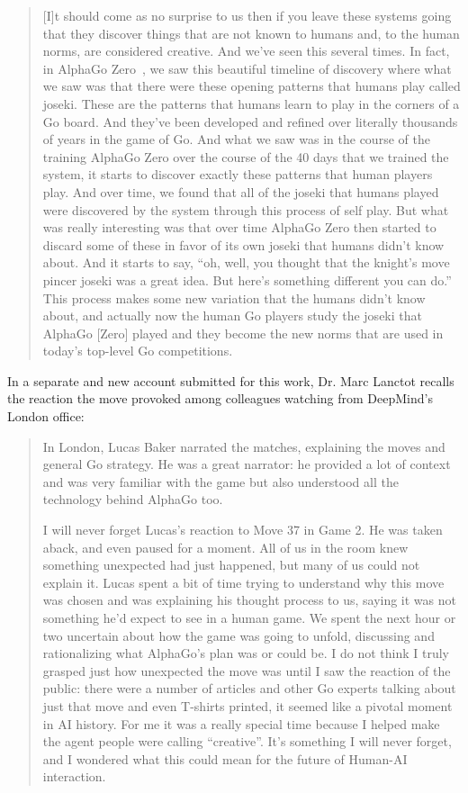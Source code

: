 \begin{quote}
[I]t should come as no surprise to us then if you leave these systems going that they discover things that are not known to humans and, to the human norms, are considered creative. And we've seen this several times. In fact, in AlphaGo Zero~\citep{silver2018general}, we saw this beautiful timeline of discovery where what we saw was that there were these opening patterns that humans play called joseki. These are the patterns that humans learn to play in the corners of a Go board. And they've been developed and refined over literally thousands of years in the game of Go. And what we saw was in the course of the training AlphaGo Zero over the course of the 40 days that we trained the system, it starts to discover exactly these patterns that human players play. And over time, we found that all of the joseki that humans played were discovered by the system through this process of self play. But what was really interesting was that over time AlphaGo Zero then started to discard some of these in favor of its own joseki that humans didn't know about. And it starts to say, ``oh, well, you thought that the knight's move pincer joseki was a great idea. But here's something different you can do.'' This process makes some new variation that the humans didn't know about, and actually now the human Go players study the joseki that AlphaGo [Zero] played and they become the new norms that are used in today's top-level Go competitions.
\end{quote}

In a separate and new account submitted for this work, Dr. Marc Lanctot recalls the reaction the move provoked among colleagues watching from DeepMind's London office:

\begin{quote}

In London, Lucas Baker narrated the matches, explaining the moves and general Go strategy. 
He was a great narrator: he provided a lot of context and was very familiar with the game but also understood all the technology behind AlphaGo too. 

I will never forget Lucas's reaction to Move 37 in Game 2. He was taken aback, and even paused for a moment. All of us in the room knew something unexpected had just happened, but many of us could not explain it. Lucas spent a bit of time trying to understand why this move was chosen and was explaining his thought process to us, saying it was not something he'd expect to see in a human game. We spent the next hour or two uncertain about how the game was going to unfold, discussing and rationalizing what AlphaGo's plan was or could be. I do not think I truly grasped just how unexpected the move was until I saw the reaction of the public: there were a number of articles and other Go experts talking about just that move and even T-shirts printed, it seemed like a pivotal moment in AI history. For me it was a really special time because I helped make the agent people were calling ``creative''. It's something I will never forget, and I wondered what this could mean for the future of Human-AI interaction.

\end{quote}

